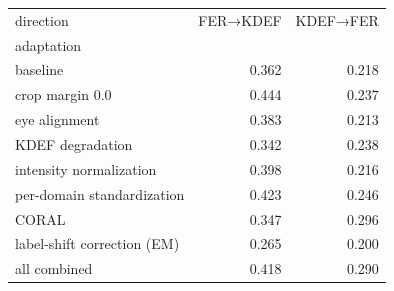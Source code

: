 \begin{tabular}{lrr}
\toprule
direction & FER→KDEF & KDEF→FER \\
adaptation &  &  \\
\midrule
baseline & 0.362 & 0.218 \\
crop margin 0.0 & 0.444 & 0.237 \\
eye alignment & 0.383 & 0.213 \\
KDEF degradation & 0.342 & 0.238 \\
intensity normalization & 0.398 & 0.216 \\
per-domain standardization & 0.423 & 0.246 \\
CORAL & 0.347 & 0.296 \\
label-shift correction (EM) & 0.265 & 0.200 \\
all combined & 0.418 & 0.290 \\
\bottomrule
\end{tabular}
